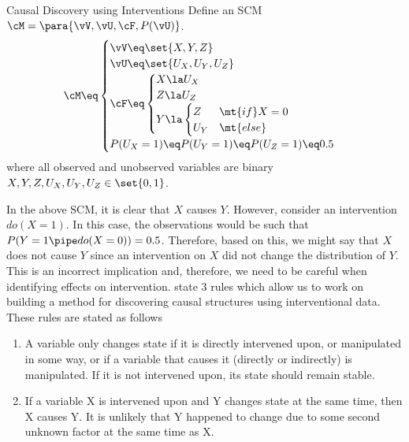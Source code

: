 \documentclass[10pt]{article}
\begin{document}
\begin{psection}[4]{Causal Discovery using Interventions}
    Define an SCM $\cM = \para{\vV, \vU, \cF, P(\vU)}$.
    \begin{align*}
        \cM
        \eq \begin{cases}
            \vV \eq \set{X, Y, Z} \\
            \vU \eq \set{U_X, U_Y, U_Z} \\
            \cF \eq \begin{cases}
                X \la U_X \\
                Z \la U_Z \\
                Y \la \begin{cases}
                    Z   & \mt{if} X = 0 \\
                    U_Y & \mt{else}
                \end{cases}
            \end{cases} \\
            P(U_X = 1) \eq P(U_Y = 1) \eq P(U_Z = 1) \eq 0.5
        \end{cases}
    \end{align*}
    where all observed and unobserved variables are binary \ie\
    $X, Y, Z, U_X, U_Y, U_Z \in \set{0, 1}$.

    In the above SCM, it is clear that $X$ causes $Y$. However, consider an intervention
    $do(X = 1)$. In this case, the observations would be such that
    $P(Y = 1 \pipe do(X = 0)) = 0.5$. Therefore, based on this, we might say that $X$
    does not cause $Y$ since an intervention on $X$ did not change the distribution of
    $Y$. This is an incorrect implication and, therefore, we need to be careful when
    identifying effects on intervention. \citet{rottman2012} state 3 rules which allow
    us to work on building a method for discovering causal structures using
    interventional data. These rules are stated as follows
    \begin{enumerate}
        \item A variable only changes state if it is directly intervened upon, or
            manipulated in some way, or if a variable that causes it (directly or
            indirectly) is manipulated. If it is not intervened upon, its state should
            remain stable.

        \item If a variable X is intervened upon and Y changes state at the same time,
            then X causes Y. It is unlikely that Y happened to change due to some second
            unknown factor at the same time as X.


\end{enumerate}
\end{psection}
\end{document}
